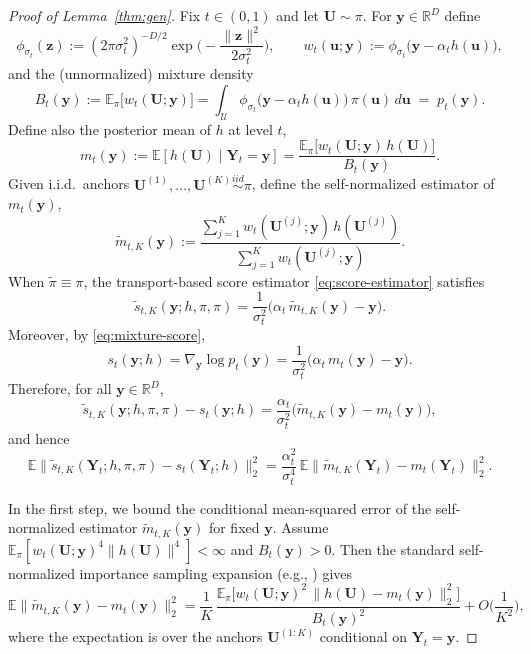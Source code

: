\documentclass[12pt]{article}
\theoremstyle{definition} %
\newcommand{\R}{\mathbb{R}}
\newcommand{\Y}{\bm Y}
\newcommand{\y}{\bm y}
\providecommand{\E}{\mathbb{E}}
\begin{document}
\begin{proof}[Proof of Lemma~\ref{thm:gen}]
Fix $t\in(0,1)$ and let $\bm U\sim\pi$. For $\y\in\R^D$ define
\[
\phi_{\sigma_t}(\bm z):=(2\pi\sigma_t^2)^{-D/2}\exp\!\Big(-\frac{\|\bm z\|^2}{2\sigma_t^2}\Big),
\qquad
w_t(\bm u;\y):=\phi_{\sigma_t}\!\big(\y-\alpha_t h(\bm u)\big),
\]
and the (unnormalized) mixture density
\[
B_t(\y):=\E_\pi\big[w_t(\bm U;\y)\big]
=
\int_{\mathcal U}\phi_{\sigma_t}\!\big(\y-\alpha_t h(\bm u)\big)\,\pi(\bm u)\,d\bm u
\;=\;p_t(\y).
\]
Define also the posterior mean of $h$ at level $t$,
\[
m_t(\y):=\E[h(\bm U)\mid \Y_t=\y]
=
\frac{\E_\pi\!\big[w_t(\bm U;\y)\,h(\bm U)\big]}{B_t(\y)}.
\]
Given i.i.d.\ anchors $\bm U^{(1)},\dots,\bm U^{(K)}\stackrel{iid}{\sim}\pi$, define the
self-normalized estimator of $m_t(\y)$,
\[
\widetilde m_{t,K}(\y)
:=
\frac{\sum_{j=1}^K w_t(\bm U^{(j)};\y)\,h(\bm U^{(j)})}{\sum_{j=1}^K w_t(\bm U^{(j)};\y)}.
\]
When $\tilde\pi\equiv\pi$, the transport-based score estimator \eqref{eq:score-estimator} satisfies
\[
\widetilde s_{t,K}(\y;h,\pi,\pi)
=
\frac{1}{\sigma_t^2}\Big(\alpha_t\,\widetilde m_{t,K}(\y)-\y\Big).
\]
Moreover, by \eqref{eq:mixture-score},
\[
s_t(\y;h)=\nabla_{\y}\log p_t(\y)
=
\frac{1}{\sigma_t^2}\Big(\alpha_t\,m_t(\y)-\y\Big).
\]
Therefore, for all $\y\in\R^D$,
\begin{equation}\label{eq:score_to_mean}
\widetilde s_{t,K}(\y;h,\pi,\pi)-s_t(\y;h)
=
\frac{\alpha_t}{\sigma_t^2}\big(\widetilde m_{t,K}(\y)-m_t(\y)\big),
\end{equation}
and hence
\begin{equation}\label{eq:mse_reduce}
\E\big\|\widetilde s_{t,K}(\Y_t;h,\pi,\pi)-s_t(\Y_t;h)\big\|_2^2
=
\frac{\alpha_t^2}{\sigma_t^4}\,
\E\big\|\widetilde m_{t,K}(\Y_t)-m_t(\Y_t)\big\|_2^2.
\end{equation}

In the first step, we bound the conditional mean-squared error of the self-normalized estimator
$\widetilde m_{t,K}(\y)$ for fixed $\y$.
Assume $\E_\pi[w_t(\bm U;\y)^4\|h(\bm U)\|^4]<\infty$ and $B_t(\y)>0$.
Then the standard self-normalized importance sampling expansion (e.g., \citet[Ch.~9]{owen2013mc})
gives
\begin{equation}\label{eq:snis_expansion}
\E\big\|\widetilde m_{t,K}(\y)-m_t(\y)\big\|_2^2
=
\frac{1}{K}\,
\frac{\E_\pi\!\big[w_t(\bm U;\y)^2\,\|h(\bm U)-m_t(\y)\|_2^2\big]}{B_t(\y)^2}
+O\!\Big(\frac{1}{K^2}\Big),
\end{equation}
where the expectation is over the anchors $\bm U^{(1:K)}$ conditional on $\Y_t=\y$.


\end{proof}
\end{document}

